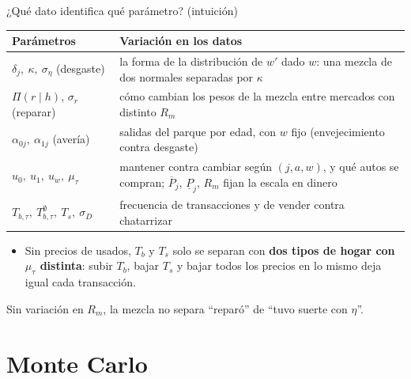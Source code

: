 \documentclass[aspectratio=169,11pt]{beamer}
\newcommand{\idea}[1]{\vspace{-0.3em}\begin{block}{}\centering\small #1\end{block}}
\begin{document}
\begin{frame}{¿Qué dato identifica qué parámetro? (intuición)}
  \begin{center}\small
  \renewcommand{\arraystretch}{1.25}
  \begin{tabular}{p{4.2cm}p{8.6cm}}
    \toprule
    Parámetros & Variación en los datos\\
    \midrule
    $\delta_j,\ \kappa,\ \sigma_\eta$ (desgaste) & la forma de la distribución de $w'$
      dado $w$: una mezcla de dos normales separadas por $\kappa$\\
    $\Pi(r\mid h)$, $\sigma_r$ (reparar) & cómo cambian los pesos de la mezcla entre
      mercados con distinto $R_m$\\
    $\alpha_{0j},\ \alpha_{1j}$ (avería) & salidas del parque por edad, con $w$ fijo
      (envejecimiento contra desgaste)\\
    $u_{0},\ u_{1},\ u_w,\ \mu_\tau$ & mantener contra cambiar según $(j,a,w)$, y qué
      autos se compran; $\overline P_j$, $\underline P_j$, $R_m$ fijan la escala en dinero\\
    $T_{b,\tau},\ T^{\emptyset}_{b,\tau},\ T_s,\ \sigma_D$ & frecuencia de transacciones
      y de vender contra chatarrizar\\
    \bottomrule
  \end{tabular}
  \end{center}
  \begin{itemize}\small
    \item Sin precios de usados, $T_b$ y $T_s$ solo se separan con \textbf{dos tipos de
          hogar con $\mu_\tau$ distinta}: subir $T_b$, bajar $T_s$ y bajar todos los
          precios en lo mismo deja igual cada transacción.
  \end{itemize}
  \idea{Sin variación en $R_m$, la mezcla no separa ``reparó'' de ``tuvo suerte con
  $\eta$''.}
\end{frame}

\section{Monte Carlo}
\end{document}
